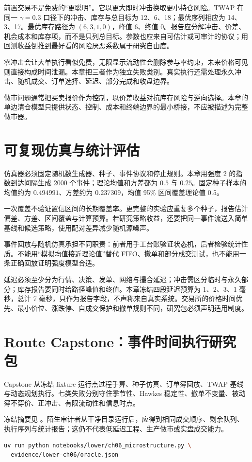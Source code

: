 前置交易不是免费的“更聪明”。它以更大即时冲击换取更小持仓风险。TWAP 在同一 $\gamma=0.3$ 口径下的冲击、库存与总目标为 12、6、18；最优序列相应为 14、3、17。最优库存路径为 $(6,3,1,0)$，峰值 6、终值 0。报告应分解冲击、价差、机会成本和库存项，而不是只列总目标。参数也应来自可估计或可审计的协议；用回测收益倒推到最好看的风险厌恶系数属于研究自由度。

零冲击会让大单执行看似免费，无限显示流动性会删除参与率约束，未来价格可见则直接构成时间泄漏。本章把三者作为独立失败类别。真实执行还需处理永久冲击、随机成交、订单选择、延迟、部分完成和收盘边界。

\begin{note}[库存控制]
做市问题通常把买卖报价作为控制，以价差收益对抗库存风险与逆向选择。本章的单边清仓模型只提供状态、控制、成本和终端边界的最小桥接，不应被描述为完整做市器。
\end{note}

\section{可复现仿真与统计评估}

仿真器必须固定随机数生成器、种子、事件协议和停止规则。本章用强度 2 的指数到达间隔生成 2000 个事件；理论均值和方差都为 $0.5$ 与 $0.25$。固定种子样本的均值约为 $0.494991$、方差约为 $0.237309$，均值 95\% 区间覆盖理论值 0.5。

一次覆盖不验证置信区间的长期覆盖率。更完整的实验应重复多个种子，报告估计偏差、方差、区间覆盖与计算预算。若研究策略收益，还要把同一事件流送入简单基线和候选策略，使用配对差异减少随机源噪声。

事件回放与随机仿真承担不同职责：前者用手工台账验证状态机，后者检验统计性质。不能用“模拟均值接近理论值”替代 FIFO、撤单和部分成交测试，也不能用一条正确回放证明强度模型合适。

延迟必须至少分为行情、决策、发单、网络与撮合延迟；冲击需区分临时与永久部分；库存报告要同时给路径峰值和终值。本章冻结四段延迟预算为 1、2、3、1 毫秒，总计 7 毫秒，只作为报告字段，不声称来自真实系统。交易所的价格时间优先、最小价位、涨跌停、自成交保护和撤单规则不同，研究包必须声明适用制度。

\section{Route Capstone：事件时间执行研究包}

Capstone 从冻结 fixture 运行点过程手算、种子仿真、订单簿回放、TWAP 基线与动态规划执行。七类失败分别守住季节性、Hawkes 稳定性、撤单不变量、被动簿不穿价、正冲击、有限流动性和信息时点。

冻结摘要见 。陌生审计者从干净目录运行后，应得到相同成交顺序、剩余队列、执行序列与统计报告；这仍不代表低延迟工程、生产做市或实盘成交能力。

\begin{implementationnote}
\begin{lstlisting}[language=bash]
uv run python notebooks/lower/ch06_microstructure.py \
  evidence/lower-ch06/oracle.json
\end{lstlisting}
\end{implementationnote}


